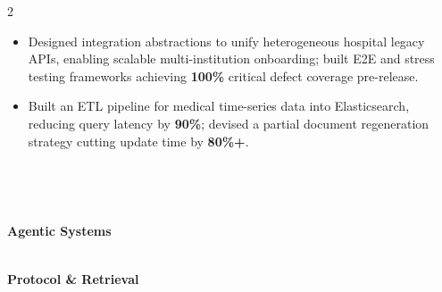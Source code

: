\documentclass[10pt,a4paper,ragged2e,withhyper]{altacv}
\begin{document}
\begin{paracol}{2}
\begin{itemize}
    \item Designed integration abstractions to unify heterogeneous hospital legacy APIs, enabling scalable multi-institution onboarding; built E2E and stress testing frameworks achieving \textbf{100\%} critical defect coverage pre-release.
    \item Built an ETL pipeline for medical time-series data into Elasticsearch, reducing query latency by \textbf{90\%}; devised a partial document regeneration strategy cutting update time by \textbf{80\%+}.
\end{itemize}

\medskip
{}

{\LaTeXraggedright
{}
\par}

\divider\smallskip

{\LaTeXraggedright
{}
\par}

\divider\smallskip \\

{\LaTeXraggedright
{}
\par}

\divider\smallskip \\
{\LaTeXraggedright
{}
\par}

\medskip

\switchcolumn


\textbf{Agentic Systems} \\
\vspace{0.4em}
  \\
 

\divider\smallskip

\textbf{Protocol \& Retrieval} \\
\vspace{0.4em}
  \\


\end{paracol}
\end{document}
